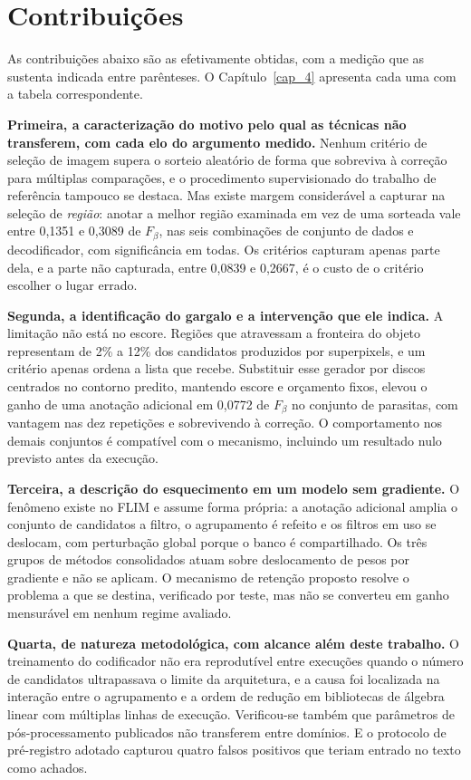 \section{Contribuições}

As contribuições abaixo são as efetivamente obtidas, com a medição que as sustenta indicada entre parênteses. O Capítulo~\ref{cap_4} apresenta cada uma com a tabela correspondente.

\textbf{Primeira, a caracterização do motivo pelo qual as técnicas não transferem, com cada elo do argumento medido.} Nenhum critério de seleção de imagem supera o sorteio aleatório de forma que sobreviva à correção para múltiplas comparações, e o procedimento supervisionado do trabalho de referência tampouco se destaca. Mas existe margem considerável a capturar na seleção de \emph{região}: anotar a melhor região examinada em vez de uma sorteada vale entre 0,1351 e 0,3089 de $F_\beta$, nas seis combinações de conjunto de dados e decodificador, com significância em todas. Os critérios capturam apenas parte dela, e a parte não capturada, entre 0,0839 e 0,2667, é o custo de o critério escolher o lugar errado.

\textbf{Segunda, a identificação do gargalo e a intervenção que ele indica.} A limitação não está no escore. Regiões que atravessam a fronteira do objeto representam de 2\% a 12\% dos candidatos produzidos por superpixels, e um critério apenas ordena a lista que recebe. Substituir esse gerador por discos centrados no contorno predito, mantendo escore e orçamento fixos, elevou o ganho de uma anotação adicional em 0,0772 de $F_\beta$ no conjunto de parasitas, com vantagem nas dez repetições e sobrevivendo à correção. O comportamento nos demais conjuntos é compatível com o mecanismo, incluindo um resultado nulo previsto antes da execução.

\textbf{Terceira, a descrição do esquecimento em um modelo sem gradiente.} O fenômeno existe no \ac{FLIM} e assume forma própria: a anotação adicional amplia o conjunto de candidatos a filtro, o agrupamento é refeito e os filtros em uso se deslocam, com perturbação global porque o banco é compartilhado. Os três grupos de métodos consolidados atuam sobre deslocamento de pesos por gradiente e não se aplicam. O mecanismo de retenção proposto resolve o problema a que se destina, verificado por teste, mas não se converteu em ganho mensurável em nenhum regime avaliado.

\textbf{Quarta, de natureza metodológica, com alcance além deste trabalho.} O treinamento do codificador não era reprodutível entre execuções quando o número de candidatos ultrapassava o limite da arquitetura, e a causa foi localizada na interação entre o agrupamento e a ordem de redução em bibliotecas de álgebra linear com múltiplas linhas de execução. Verificou-se também que parâmetros de pós-processamento publicados não transferem entre domínios. E o protocolo de pré-registro adotado capturou quatro falsos positivos que teriam entrado no texto como achados.

